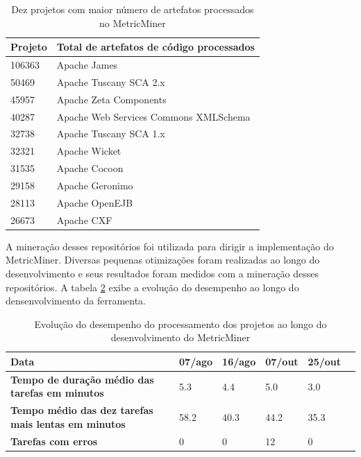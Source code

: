 \documentclass[a4paper, 12pt, twoside]{book}
\begin{document}
        \begin{table}\begin{center}
        \begin{tabular}{| p{5cm} | p{8.5cm} |}
            \hline                        
            \textbf{Projeto} & \textbf{Total de artefatos de código processados} \\
            \hline
            106363 & Apache James \\
            \hline
            50469 & Apache Tuscany SCA 2.x \\
            \hline
            45957 & Apache Zeta Components \\
            \hline
            40287 & Apache Web Services Commons XMLSchema \\
            \hline
            32738 & Apache Tuscany SCA 1.x \\
            \hline
            32321 & Apache Wicket \\
            \hline
            31535 & Apache Cocoon \\
            \hline
            29158 & Apache Geronimo \\
            \hline
            28113 & Apache OpenEJB \\
            \hline
            26673 & Apache CXF \\
            \hline
        \end{tabular}
        \caption{Dez projetos com maior número de artefatos processados no MetricMiner \label{tab:artefatos}}
        \end{center}\end{table}

        A mineração desses repositórios foi utilizada para dirigir a implementação do MetricMiner. Diversas pequenas otimizações foram realizadas ao longo do desenvolvimento e seus resultados foram medidos com a mineração desses repositórios. A tabela \ref{tab:evolucao} exibe a evolução do desempenho ao longo do densenvolvimento da ferramenta.


        \begin{table}\begin{center}
        \begin{tabular}{| p{5cm} | p{1.8cm} | p{1.8cm} | p{1.8cm} | p{1.8cm} | p{1.8cm} | }
            \hline                        
            \textbf{Data} & \textbf{07/ago} & \textbf{16/ago} & \textbf{07/out} 
             & \textbf{25/out} \\
            \hline
            \textbf{Tempo de duração médio das tarefas em minutos} & 5.3 & 4.4 & 5.0 & 3.0 \\
            \hline
            \textbf{Tempo médio das dez tarefas mais lentas em minutos} & 58.2 & 40.3 & 44.2 & 35.3 \\
            \hline
            \textbf{Tarefas com erros} & 0 & 0 & 12 & 0 \\
            \hline
        \end{tabular}
        \caption{Evolução do desempenho do processamento dos projetos ao longo do desenvolvimento do MetricMiner \label{tab:evolucao}}
        \end{center}\end{table}
\end{document}
